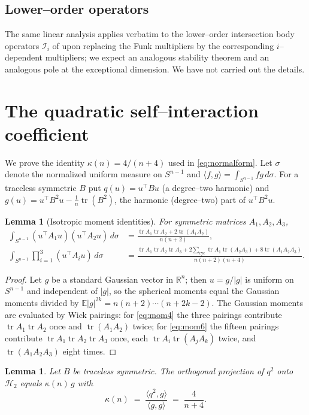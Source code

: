 \documentclass[10pt,a4paper]{amsart}
\newtheorem{lemma}[theorem]{Lemma}
\newcommand{\R}{\mathbb{R}}
\newcommand{\Sph}{S^{n-1}}
\newcommand{\IB}{\mathcal{I}}
\newcommand{\Hd}[1]{\mathcal{H}_{#1}}
\newcommand{\abs}[1]{\left\lvert #1 \right\rvert}
\newcommand{\ip}[2]{\langle #1, #2 \rangle}
\DeclareMathOperator{\tr}{tr}
\begin{document}
\subsection{Lower--order operators}
The same linear analysis applies verbatim to the lower--order intersection
body operators $\IB_i$ of \cite{Gardner1994,LinXiong2025} upon replacing the
Funk multipliers by the corresponding $i$--dependent multipliers; we expect an
analogous stability theorem and an analogous pole at the exceptional dimension.
We have not carried out the details.

\appendix
\section{The quadratic self--interaction coefficient}\label{app:symbolic}

We prove the identity $\kappa(n)=4/(n+4)$ used in \eqref{eq:normalform}. Let
$\sigma$ denote the normalized uniform measure on $\Sph$ and
$\ip fg=\int_{\Sph}fg\,d\sigma$. For a traceless symmetric $B$ put
$q(u)=u^\top Bu$ (a degree--two harmonic) and
$g(u)=u^\top B^2u-\tfrac1n\tr(B^2)$, the harmonic (degree--two) part of
$u^\top B^2u$.

\begin{lemma}[Isotropic moment identities]\label{lem:moments}
For symmetric matrices $A_1,A_2,A_3$,
\begin{align}
\int_{\Sph}(u^\top A_1u)(u^\top A_2u)\,d\sigma
&=\frac{\tr A_1\tr A_2+2\tr(A_1A_2)}{n(n+2)},\label{eq:mom4}\\
\int_{\Sph}\prod_{i=1}^{3}(u^\top A_iu)\,d\sigma
&=\frac{\tr A_1\tr A_2\tr A_3
+2\sum_{\text{cyc}}\tr A_1\tr(A_2A_3)+8\tr(A_1A_2A_3)}{n(n+2)(n+4)}.
\label{eq:mom6}
\end{align}
\end{lemma}

\begin{proof}
Let $g$ be a standard Gaussian vector in $\R^n$; then $u=g/\abs g$ is uniform
on $\Sph$ and independent of $\abs g$, so the spherical moments equal the
Gaussian moments divided by $\mathbb E\abs g^{2k}=n(n+2)\cdots(n+2k-2)$. The
Gaussian moments are evaluated by Wick pairings: for \eqref{eq:mom4} the three
pairings contribute $\tr A_1\tr A_2$ once and $\tr(A_1A_2)$ twice; for
\eqref{eq:mom6} the fifteen pairings contribute $\tr A_1\tr A_2\tr A_3$ once,
each $\tr A_i\tr(A_jA_k)$ twice, and $\tr(A_1A_2A_3)$ eight times.
\end{proof}

\begin{lemma}\label{lem:kappa}
Let $B$ be traceless symmetric. The orthogonal projection of $q^2$ onto
$\Hd2$ equals $\kappa(n)\,g$ with
\[
   \kappa(n)\;=\;\frac{\ip{q^2}{g}}{\ip gg}\;=\;\frac{4}{n+4}.
\]
\end{lemma}
\end{document}
